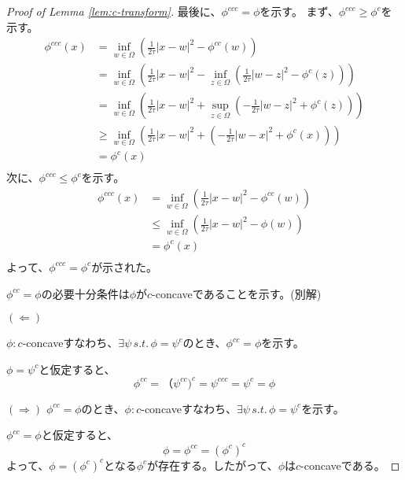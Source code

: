 \documentclass{jsarticle}
\theoremstyle{definition}
\begin{document}
\begin{proof}[Proof of Lemma \ref{lem:c-transform}]
    最後に、$\phi^{ccc} = \phi$を示す。
    まず、$\phi^{ccc} \geq \phi^c$を示す。
    \begin{align*}
    \phi^{ccc}(x)   &= \inf_{w \in \Omega} \left( \frac{1}{2 \tau} |x - w|^2 - \phi^{cc}(w) \right)\\
                    &= \inf_{w \in \Omega} \left( \frac{1}{2 \tau} |x - w|^2 - \inf_{z \in \Omega}\left( \frac{1}{2 \tau} |w - z|^2 - \phi^c(z)\right)\right)\\
                    &= \inf_{w \in \Omega} \left( \frac{1}{2 \tau} |x - w|^2 + \sup_{z \in \Omega}\left( - \frac{1}{2 \tau} |w - z|^2 + \phi^c(z)\right)\right)\\
                    &\geq \inf_{w \in \Omega} \left( \frac{1}{2 \tau} |x - w|^2 + \left( - \frac{1}{2 \tau} |w - x|^2 + \phi^c(x)\right)\right)\\
                    &= \phi^c(x)\\
    \end{align*}
    次に、$\phi^{ccc} \leq \phi^c$を示す。
    \begin{align*}
    \phi^{ccc}(x)   &= \inf_{w \in \Omega} \left( \frac{1}{2 \tau} |x - w|^2 - \phi^{cc}(w) \right)\\
                    &\leq \inf_{w \in \Omega} \left( \frac{1}{2 \tau} |x - w|^2 - \phi(w) \right)\\
                    &= \phi^c(x)\\
    \end{align*}
    よって、$\phi^{ccc} = \phi^c$が示された。

    {\color{gray}
    $\phi^{cc} = \phi$の必要十分条件は$\phi$が$c$-concaveであることを示す。(別解)

    $(\Leftarrow)$

    $\phi: c$-concaveすなわち、$\exists \psi \, s.t. \, \phi = \psi^c$のとき、$\phi^{cc} = \phi$を示す。

    $\phi = \psi^c$と仮定すると、
    $$
    \phi^{cc} =（\psi^{cc})^c = \psi^{ccc} = \psi^c = \phi
    $$

    $(\Rightarrow)$
    $\phi^{cc} = \phi$のとき、$\phi: c$-concaveすなわち、$\exists \psi \, s.t. \, \phi = \psi^c$を示す。

    $\phi^{cc} = \phi$と仮定すると、
    $$
    \phi = \phi^{cc} = (\phi^c)^c
    $$
    よって、$\phi = (\phi^c)^c$となる$\phi^c$が存在する。したがって、$\phi$は$c$-concaveである。
    }
\end{proof}
\end{document}
